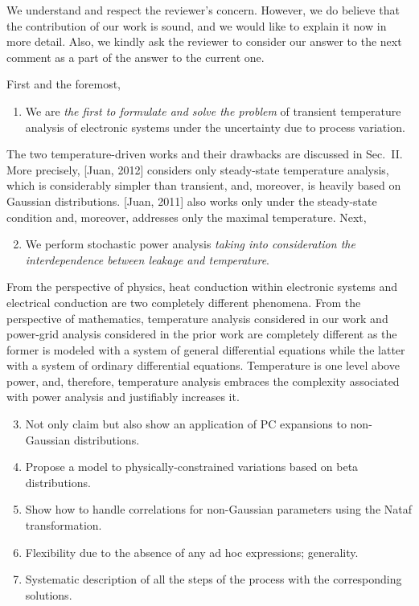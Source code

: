 \begin{authors}
We understand and respect the reviewer's concern.
However, we do believe that the contribution of our work is sound, and we would like to explain it now in more detail.
Also, we kindly ask the reviewer to consider our answer to the next comment as a part of the answer to the current one.

First and the foremost,
\begin{enumerate}
  \item We are \emph{the first to formulate and solve the problem} of transient temperature analysis of electronic systems under the uncertainty due to process variation.
\end{enumerate}
The two temperature-driven works and their drawbacks are discussed in Sec.~II.
More precisely, [Juan, 2012] considers only steady-state temperature analysis, which is considerably simpler than transient, and, moreover, is heavily based on Gaussian distributions.
[Juan, 2011] also works only under the steady-state condition and, moreover, addresses only the maximal temperature.
Next,
\begin{enumerate}
  \setcounter{enumi}{1}
  \item We perform stochastic power analysis \emph{taking into consideration the interdependence between leakage and temperature}.
\end{enumerate}
From the perspective of physics, heat conduction within electronic systems and electrical conduction are two completely different phenomena.
From the perspective of mathematics, temperature analysis considered in our work and power-grid analysis considered in the prior work are completely different as the former is modeled with a system of general differential equations while the latter with a system of ordinary differential equations.
Temperature is one level above power, and, therefore, temperature analysis embraces the complexity associated with power analysis and justifiably increases it.
\begin{enumerate}
  \setcounter{enumi}{2}
  \item Not only claim but also show an application of PC expansions to non-Gaussian distributions.
  \item Propose a model to physically-constrained variations based on beta distributions.
  \item Show how to handle correlations for non-Gaussian parameters using the Nataf transformation.
  \item Flexibility due to the absence of any ad hoc expressions; generality.
  \item Systematic description of all the steps of the process with the corresponding solutions.
\end{enumerate}


\end{authors}
